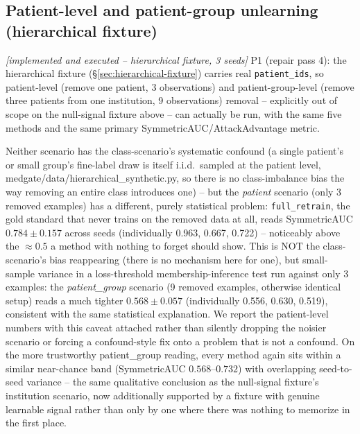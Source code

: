 \documentclass[11pt]{article}
\newcommand{\status}[1]{\textit{[#1]}}
\begin{document}
\subsection{Patient-level and patient-group unlearning (hierarchical
fixture)}
\label{sec:hierarchical-unlearning}
\status{implemented and executed -- hierarchical fixture, 3 seeds}
P1 (repair pass 4): the hierarchical fixture (\S\ref{sec:hierarchical-fixture})
carries real \texttt{patient\_ids}, so patient-level (remove one patient,
3 observations) and patient-group-level (remove three patients from one
institution, 9 observations) removal -- explicitly out of scope on the
null-signal fixture above -- can actually be run, with the same five
methods and the same primary SymmetricAUC/AttackAdvantage metric.

\label{tab:phase5-hierarchical}
Neither scenario has the class-scenario's systematic confound (a single
patient's or small group's fine-label draw is itself i.i.d.\ sampled at
the patient level, medgate/data/hierarchical\_synthetic.py, so there is no
class-imbalance bias the way removing an entire class introduces one) --
but the \emph{patient} scenario (only 3 removed examples) has a different,
purely statistical problem: \texttt{full\_retrain}, the gold standard that
never trains on the removed data at all, reads SymmetricAUC
$0.784 \pm 0.157$ across seeds (individually 0.963, 0.667, 0.722) --
noticeably above the $\approx 0.5$ a method with nothing to forget should
show. This is NOT the class-scenario's bias reappearing (there is no
mechanism here for one), but small-sample variance in a loss-threshold
membership-inference test run against only 3 examples: the
\emph{patient\_group} scenario (9 removed examples, otherwise identical
setup) reads a much tighter $0.568 \pm 0.057$ (individually 0.556, 0.630,
0.519), consistent with the same statistical explanation. We report the
patient-level numbers with this caveat attached rather than silently
dropping the noisier scenario or forcing a confound-style fix onto a
problem that is not a confound. On the more trustworthy patient\_group
reading, every method again sits within a similar near-chance band
(SymmetricAUC $0.568$--$0.732$) with overlapping seed-to-seed variance --
the same qualitative conclusion as the null-signal fixture's institution
scenario, now additionally supported by a fixture with genuine learnable
signal rather than only by one where there was nothing to memorize in the
first place.
\end{document}
